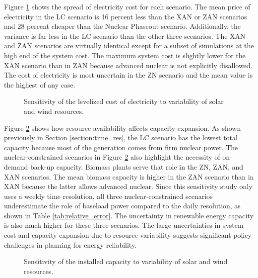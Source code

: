 Figure \ref{fig:obj_cost_plot} shows the spread of electricity cost for each scenario.
The mean price of electricity in the \gls{LC} scenario is 16 percent less than
the \gls{XAN} or \gls{ZAN} scenarios and 28 percent cheaper than the Nuclear Phaseout scenario.
Additionally, the variance is far less in the \gls{LC} scenario than the other
three scenarios. The \gls{XAN} and \gls{ZAN} scenarios are virtually identical
except for a subset of simulations at the high end of the system cost. The maximum
system cost is slightly lower for the \gls{XAN} scenario than in \gls{ZAN} because advanced
nuclear is not explicitly disallowed. The cost of electricity is most uncertain
in the \gls{ZN} scenario and the mean value is the highest of any case.

\begin{figure}[H]
  \centering
  \resizebox{0.95\columnwidth}{!}{}
  \caption{Sensitivity of the levelized cost of electricity to variability of
   solar and wind resources.}
  \label{fig:obj_cost_plot}
\end{figure}

Figure \ref{fig:il_capacity} shows how resource availability affects capacity
expansion. As shown previously in Section \ref{section:time_res}, the \gls{LC} scenario
has the lowest total capacity because most of the generation comes from firm nuclear
power. The nuclear-constrained scenarios in Figure \ref{fig:il_capacity} also
highlight the necessity of on-demand back-up capacity. Biomass plants serve that role
in the \gls{ZN}, \gls{ZAN}, and \gls{XAN} scenarios. The mean biomass capacity is higher
in the \gls{ZAN} scenario than in \gls{XAN} because the latter allows advanced nuclear. Since
this sensitivity study only uses a weekly time resolution, all three nuclear-constrained
scenarios underestimate the role of baseload power compared to the daily resolution,
as shown in Table \ref{tab:relative_error}. The uncertainty in renewable energy
capacity is also much higher for these three scenarios.
The large uncertainties in system cost and capacity expansion due to resource
variability suggests significant policy challenges in planning for energy
reliability.


\begin{figure}[H]
  \centering
  \resizebox{0.95\columnwidth}{!}{}
  \caption{Sensitivity of the installed capacity to variability of
   solar and wind resources.}
  \label{fig:il_capacity}
\end{figure}

